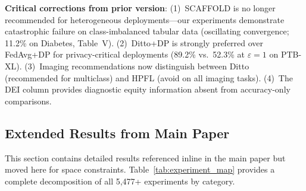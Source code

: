 \documentclass[conference]{IEEEtran}
\begin{document}
\textbf{Critical corrections from prior version}: (1)~SCAFFOLD is no longer recommended for heterogeneous deployments---our experiments demonstrate catastrophic failure on class-imbalanced tabular data (oscillating convergence; 11.2\% on Diabetes, Table~V). (2)~Ditto+DP is strongly preferred over FedAvg+DP for privacy-critical deployments (89.2\% vs.\ 52.3\% at $\varepsilon{=}1$ on PTB-XL). (3)~Imaging recommendations now distinguish between Ditto (recommended for multiclass) and HPFL (avoid on all imaging tasks). (4)~The DEI column provides diagnostic equity information absent from accuracy-only comparisons.


\subsection{Extended Results from Main Paper}
\label{sec:main_extended}

This section contains detailed results referenced inline in the main paper but moved here for space constraints. Table~\ref{tab:experiment_map} provides a complete decomposition of all 5,477+ experiments by category.
\end{document}
